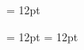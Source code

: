 \documentclass[a4paper,twoside]{article}
\begin{document}
\begin{multicols}{2}
\begin{spacing}{0.5}{\raggedright}
\begin{spacing}{0.5}{\raggedright} 
\spanheadwordminorentryvariantletDatadicBody{ }\spanvisiblevariantentryrefsminorentryvariantletDatadicBody{ \{} \spanspanmxbheadwordreferencedentryreferencedentriesvisiblevariantentryrefvisiblevariantentryrefsminorentryvariantletDatadicBody{ } \spanvisiblevariantentryrefsminorentryvariantletDatadicBody{\} }\spanspanessummarydefinitionminorentryvariantletDatadicBody{ }  \end{spacing}
\begin{spacing}{0.5}
\hangindent= 12pt
  \spanspanespartofspeechmorphosyntaxanalysissensesensecontentsensesentryletDatadicBody{ } \spanspanesdefinitionsensesensecontentsensesentryletDatadicBody{ } \end{spacing}
\begin{spacing}{0.5}
\hangindent= 12pt
\hangindent= 12pt

\end{spacing}
\end{spacing}
\end{multicols}
\end{document}
